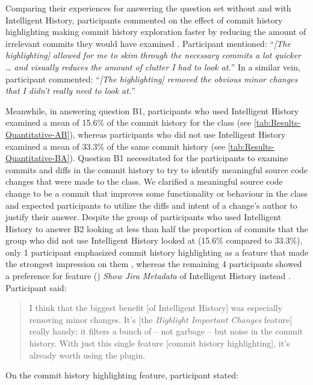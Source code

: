 Comparing their experiences for answering the question set without and with Intelligent History, 
participants commented on the effect of commit history highlighting making commit history exploration faster by reducing the amount of irrelevant commits they would have examined .
Participant  mentioned: 
``\textit{[The highlighting] allowed for me to skim through the necessary commits a lot quicker \dots 
and visually reduces the amount of clutter I had to look at.}''
In a similar vein, participant  commented:
``\textit{[The highlighting] removed the obvious minor changes that I didn’t really need to look at.}''

Meanwhile, in answering question B1, participants who used Intelligent History 
examined a mean of 15.6\% of the commit history for the  class (see \autoref{tab:Results-Quantitative-AB}),
whereas participants who did not use Intelligent History examined a mean of 33.3\% of the same 
commit history (see \autoref{tab:Results-Quantitative-BA}).
Question B1 necessitated for the participants to examine commits and diffs in the  commit history 
to try to identify meaningful source code changes that were made to the class.
We clarified a meaningful source code change to be a commit that improves some functionality 
or behaviour in the class and expected participants to utilize the diffs and intent of a change's author to justify their answer.
Despite the group of participants who used Intelligent History to answer B2 looking at less than half the 
proportion of commits that the group who did not use Intelligent History looked at (15.6\% compared to 33.3\%),
only 1 participant emphasized commit history highlighting as a feature that made the strongest impression on them , 
whereas the remaining 4 participants showed a preference for feature 
() \textit{Show Jira Metadata} of Intelligent History instead .
Participant  said:

\begin{quote}
  I think that the biggest benefit [of Intelligent History] was especially removing minor changes. 
  It’s [the \textit{Highlight Important Changes} feature] really handy; it filters a bunch of -- not garbage -- but noise in the commit history. 
  With just this single feature [commit history highlighting], it’s already worth using the plugin.
\end{quote}

On the commit history highlighting feature, participant  stated:

